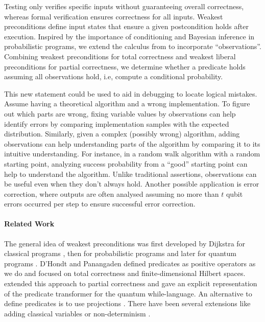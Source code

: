 \documentclass[a4paper,UKenglish,cleveref, autoref, thm-restate]{lipics-v2021}
\begin{document}
Testing only verifies specific inputs without guaranteeing overall correctness, whereas formal verification ensures correctness for all inputs.
Weakest preconditions define input states that ensure a given postcondition holds after execution. Inspired by the importance of conditioning and Bayesian inference in probabilistic programs, we extend the calculus from \cite{DHondtWeakestPreconditions,floydHoareLogic} to incorporate ``observations''. Combining weakest preconditions for total correctness and weakest liberal preconditions for partial correctness, we determine whether a predicate holds assuming all observations hold, i.e, compute a conditional probability.

This new statement could be used to aid in debugging to locate logical mistakes. Assume having a theoretical algorithm and a wrong implementation. To figure out which parts are wrong, fixing variable values by observations can help identify errors by comparing implementation samples with the expected distribution. Similarly, given a complex (possibly wrong) algorithm, adding observations can help understanding parts of the algorithm by comparing it to its intuitive understanding. For instance, in a random walk algorithm with a random starting point, analyzing success probability from a ``good'' starting point can help to understand the algorithm.
Unlike traditional assertions, observations can be useful even when they don’t always hold.
Another possible application is error correction, where outputs are often analysed assuming no more than $t$ qubit errors occurred per step to ensure successful error correction.

\paragraph*{Related Work}
The general idea of weakest preconditions was first developed by Dijkstra for classical programs \cite{Dijkstra76,Dijkstra75}, then for probabilistic programs \cite{KOZEN1985162,McIverWpProb} and later for quantum programs \cite{DHondtWeakestPreconditions}. D'Hondt and Panangaden \cite{DHondtWeakestPreconditions} defined predicates as positive operators as we do and focused on total correctness and finite-dimensional Hilbert spaces. \cite{floydHoareLogic} extended this approach to partial correctness and gave an explicit representation of the predicate transformer for the quantum while-language.
An alternative to define predicates is to use projections \cite{ZhouAppliedQHL}. There have been several extensions like adding classical variables \cite{DENG202273, FengQHLClassicalVars} or non-determinism \cite{FengNondeterministicQuantumVerification}.
\end{document}
